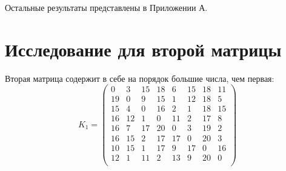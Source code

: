 \documentclass{bmstu}
\begin{document}
Остальные результаты представлены в Приложении А.

\section{Исследование для второй матрицы}
Вторая матрица содержит в себе на порядок большие числа, чем первая:
\begin{equation}
	\label{eq:kd2}
	K_{1} = \begin{pmatrix}
		0 &3 &15 &18 &6 &15 &18 &11\\
            19 &0 &9 &15 &1 &12 &18 &5\\
            15 &4 &0 &16 &2 &1 &18 &15\\
            16 &12 &1 &0 &11 &2 &17 &8\\
            16 &7 &17 &20 &0 &3 &19&2\\
            16 &15 &2 &17 &17 &0 &20 &3\\
            10 &15 &1 &17 &9 &17 &0 &16\\
            12 &1 &11 &2 &13 &9 &20 &0\\
	\end{pmatrix}
\end{equation}
\end{document}
